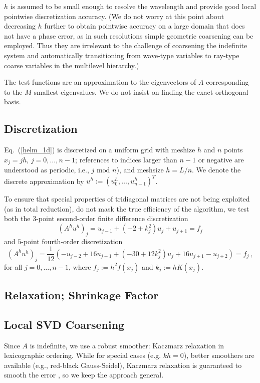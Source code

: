 \documentclass{article}
\begin{document}
$h$ is assumed to be small enough to resolve the wavelength and provide good local pointwise discretization accuracy. (We do not worry at this point about decreasing $h$ further to obtain pointwise accuracy on a large domain that does not have a phase error, as in such resolutions simple geometric coarsening can be employed. Thus they are irrelevant to the challenge of coarsening the indefinite system and automatically transitioning from wave-type variables to ray-type coarse variables in the multilevel hierarchy.)

The test functions are an approximation to the eigenvectors of $A$ corresponding to the $M$ smallest eigenvalues. We do not insist on finding the exact orthogonal basis.

\subsection{Discretization}
\label{discretization}
Eq.~(\ref{helm_1d}) is discretized on a uniform grid with meshize $h$ and $n$ points $x_j = j h$, $j= 0,\dots,n-1$; references to indices larger than $n - 1$ or negative are understood as periodic, i.e., $j \text{ mod } n$), and meshsize $h = L/n$. We denote the discrete approximation by $u^h := (u^h_0,\dots,u^h_{n-1})^T$.

To ensure that special properties of tridiagonal matrices are not being exploited (as in total reduction), 
do not mask the true efficiency of the algorithm, we test both the $3$-point second-order finite difference discretization 
$$ (A^h u^h)_j = u_{j-1} + (-2 + k_j^2) u_j + u_{j+1} = f_j$$
and $5$-point  fourth-order discretization
$$ (A^h u^h)_j = \frac{1}{12} \left( -u_{j-2} + 16 u_{j-1} + (-30 + 12 k_j^2) u_j + 16 u_{j+1} - u_{j+2} \right) = f_j\,, $$
for all $j = 0,\dots,n-1$, where $f_j := h^2 f(x_j)$ and $k_j := h K(x_j)$.

\subsection{Relaxation; Shrinkage Factor}
\label{sec:relaxation}

\subsection{Local SVD Coarsening}
\label{svd_coarsening}

Since $A$ is indefinite, we use a robust smoother: Kaczmarz relaxation in lexicographic ordering. While for special cases (e.g. $k h = 0$), better smoothers are available (e.g., red-black Gauss-Seidel), Kaczmarz relaxation is guaranteed to smooth the error \cite{amg_theory}, so we keep the approach general.
\end{document}
